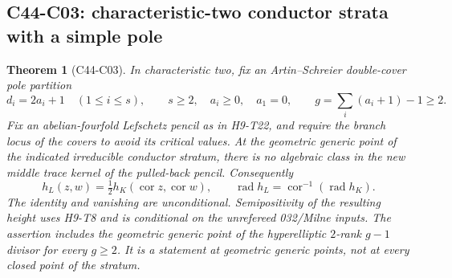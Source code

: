 \documentclass[11pt]{article}
\newtheorem{theorem}{Theorem}[section]
\theoremstyle{remark}\newtheorem{remark}[theorem]{Remark}
\begin{document}
\subsection{C44-C03: characteristic-two conductor strata with a simple pole}
\begin{theorem}[C44-C03]\label{thm:AS-strata}
In characteristic two, fix an Artin--Schreier double-cover pole partition
\[
 d_i=2a_i+1\quad(1\le i\le s),\qquad
 s\ge2,\quad a_i\ge0,\quad a_1=0,
 \qquad g=\sum_i(a_i+1)-1\ge2.
\]
Fix an abelian-fourfold Lefschetz pencil as in H9-T22, and require the
branch locus of the covers to avoid its critical values. At the geometric
generic point of the indicated irreducible conductor stratum, there is
no algebraic class in the new middle trace kernel of the pulled-back
pencil. Consequently
\[
 h_L(z,w)=\tfrac12h_K(\operatorname{cor}z,\operatorname{cor}w),
 \qquad \operatorname{rad}h_L=
 \operatorname{cor}^{-1}(\operatorname{rad}h_K).
 \tag{C44.C03.1}
\]
The identity and vanishing are unconditional. Semipositivity of the
resulting height uses H9-T8 and is conditional on the unrefereed
032/Milne inputs. The assertion includes the geometric generic point
of the hyperelliptic $2$-rank $g-1$ divisor for every $g\ge2$.
It is a statement at geometric generic points, not at every closed
point of the stratum.
\end{theorem}
\end{document}

